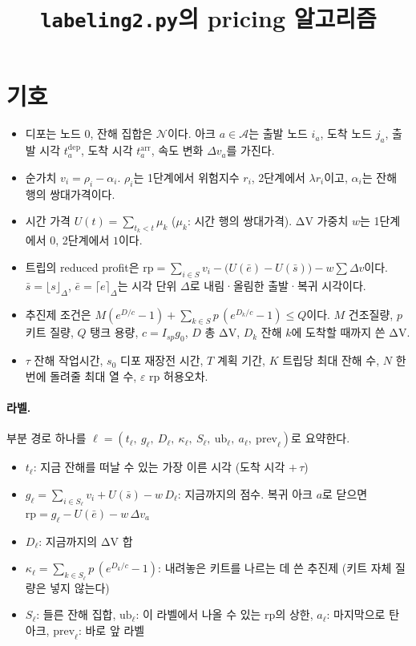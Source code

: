 \documentclass[10pt]{article}
\title{\texttt{labeling2.py}의 pricing 알고리즘}
\date{}
\newcommand{\dep}{\mathrm{dep}}
\newcommand{\arr}{\mathrm{arr}}
\newcommand{\ub}{\mathrm{ub}}
\newcommand{\rp}{\mathrm{rp}}
\begin{document}
\maketitle

\section*{기호}
\begin{itemize}
  \item 디포는 노드 $0$, 잔해 집합은 $\mathcal{N}$이다.
        아크 $a\in\mathcal{A}$는 출발 노드 $i_a$, 도착 노드 $j_a$, 출발 시각 $t^{\dep}_a$,
        도착 시각 $t^{\arr}_a$, 속도 변화 $\Delta v_a$를 가진다.
  \item 순가치 $v_i=\rho_i-\alpha_i$. $\rho_i$는 1단계에서 위험지수 $r_i$, 2단계에서 $\lambda r_i$이고,
        $\alpha_i$는 잔해 행의 쌍대가격이다.
  \item 시간 가격 $U(t)=\sum_{t_k<t}\mu_k$ ($\mu_k$: 시간 행의 쌍대가격).
        ΔV 가중치 $w$는 1단계에서 $0$, 2단계에서 $1$이다.
  \item 트립의 reduced profit은
        $\rp=\sum_{i\in S}v_i-\bigl(U(\bar e)-U(\bar s)\bigr)-w\sum\Delta v$이다.
        $\bar s=\lfloor s\rfloor_\Delta$, $\bar e=\lceil e\rceil_\Delta$는 시각 단위 $\Delta$로 내림·올림한 출발·복귀 시각이다.
  \item 추진제 조건은 $M(e^{D/c}-1)+\sum_{k\in S}p\,(e^{D_k/c}-1)\le Q$이다.
        $M$ 건조질량, $p$ 키트 질량, $Q$ 탱크 용량, $c=I_{sp}g_0$,
        $D$ 총 ΔV, $D_k$ 잔해 $k$에 도착할 때까지 쓴 ΔV.
  \item $\tau$ 잔해 작업시간, $s_0$ 디포 재장전 시간, $T$ 계획 기간,
        $K$ 트립당 최대 잔해 수, $N$ 한 번에 돌려줄 최대 열 수, $\varepsilon$ rp 허용오차.
\end{itemize}

\paragraph{라벨.}
부분 경로 하나를 $\ell=(t_\ell,\ g_\ell,\ D_\ell,\ \kappa_\ell,\ S_\ell,\ \ub_\ell,\ a_\ell,\ \mathrm{prev}_\ell)$로 요약한다.
\begin{itemize}
  \item $t_\ell$: 지금 잔해를 떠날 수 있는 가장 이른 시각 (도착 시각 $+\,\tau$)
  \item $g_\ell=\sum_{i\in S_\ell}v_i+U(\bar s)-w\,D_\ell$: 지금까지의 점수.
        복귀 아크 $a$로 닫으면 $\rp=g_\ell-U(\bar e)-w\,\Delta v_a$
  \item $D_\ell$: 지금까지의 ΔV 합
  \item $\kappa_\ell=\sum_{k\in S_\ell}p\,(e^{D_k/c}-1)$: 내려놓은 키트를 나르는 데 쓴 추진제 (키트 자체 질량은 넣지 않는다)
  \item $S_\ell$: 들른 잔해 집합, $\ub_\ell$: 이 라벨에서 나올 수 있는 rp의 상한,
        $a_\ell$: 마지막으로 탄 아크, $\mathrm{prev}_\ell$: 바로 앞 라벨
\end{itemize}
\end{document}
